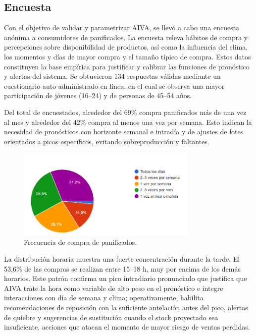 \subsection{Encuesta}

Con el objetivo de validar y parametrizar AIVA, se llevó a cabo una encuesta anónima a consumidores de panificados. La encuesta releva hábitos de compra y percepciones sobre disponibilidad de productos, así como la influencia del clima, los momentos y días de mayor compra y el tamaño típico de compra. Estos datos constituyen la base empírica para justificar y calibrar las funciones de pronóstico y alertas del sistema. Se obtuvieron 134 respuestas válidas mediante un cuestionario auto-administrado en línea, en el cual se observa una mayor participación de jóvenes (16–24) y de personas de 45–54 años.

Del total de encuestados, alrededor del 69\% compra panificados más de una vez al mes y alrededor del 42\% compra al menos una vez por semana. Esto indican la necesidad de pronósticos con horizonte semanal e intradía y de ajustes de lotes orientados a picos específicos, evitando sobreproducción y faltantes.

\begin{figure}[t]
    \centering
    \includegraphics[width=0.78\textwidth]{images/FrecuenciaCompraPanificados.png}
    \caption{Frecuencia de compra de panificados.}
    \label{fig:frecuencia-compra-panificados}
\end{figure}

La distribución horaria muestra una fuerte concentración durante la tarde. El 53,6\% de las compras se realizan entre 15–18 h, muy por encima de los demás horarios. Este patrón confirma un pico intradiario pronunciado que justifica que AIVA trate la hora como variable de alto peso en el pronóstico e integre interacciones con día de semana y clima; operativamente, habilita recomendaciones de reposición con la suficiente antelación antes del pico, alertas de quiebre y sugerencias de sustitución cuando el stock proyectado sea insuficiente, acciones que atacan el momento de mayor riesgo de ventas perdidas.

